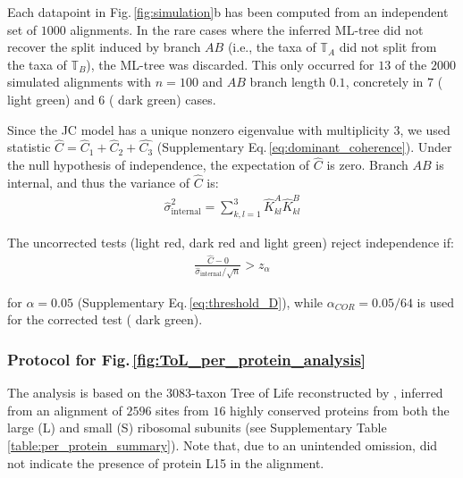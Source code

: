 \medskip

Each datapoint in Fig.\,\ref{fig:simulation}b has been computed from an independent set of $1000$ alignments. In the rare cases where the inferred ML-tree did not recover the split induced by branch $AB$ (i.e., the taxa of $\mathbb{T}_A$ did not split from the taxa of $\mathbb{T}_B$), the ML-tree was discarded. This only occurred for $13$ of the $2000$ simulated alignments with $n=100$ and $AB$ branch length $0.1$, concretely in $7$ ({\color{MLtree} light green}) and $6$ ({\color{MLtreeBonferroni} dark green}) cases.
\medskip

Since the JC model has a unique nonzero eigenvalue with multiplicity $3$, we used statistic $\hat{C} = \hat{C}_1+\hat{C}_2+\hat{C_3}$ (Supplementary Eq.\,\eqref{eq:dominant_coherence}). Under the null hypothesis of independence, the expectation of $\hat{C}$ is zero. Branch $AB$ is internal, and thus the variance of $\hat C$ is:
\begin{align*}
  \hat{\sigma}^2_{\text{internal}}=  \sum_{k, l=1}^3 \hat{K}^A_{kl}   \hat{K}^B_{kl}
\end{align*}

The uncorrected tests ({\color{truetree}light red}, {\color{truetreeML} dark red} and {\color{MLtree} light green}) reject independence if:
\begin{align*}
 \frac{\hat{C}-0}{\hat{\sigma}_{\text{internal}}/\sqrt{n}} > z_\alpha 
\end{align*}

for $\alpha=0.05$ (Supplementary Eq.\,\eqref{eq:threshold_D}), while $\alpha_{COR}=0.05/64$  is used for the corrected test ({\color{MLtreeBonferroni} dark green}).

\bigskip



\subsubsection*{Protocol for Fig.\,\ref{fig:ToL_per_protein_analysis}}
\label{msec:protocol_per_protein_analysis}
The analysis is based on the $3083$-taxon Tree of Life reconstructed by  , inferred from an alignment of $2596$ sites from $16$ highly conserved proteins from both the large  (L) and small (S) ribosomal subunits (see Supplementary Table \ref{table:per_protein_summary}). Note that, due to an unintended omission,  did not indicate the presence of protein L15 in the alignment. 

\medskip

